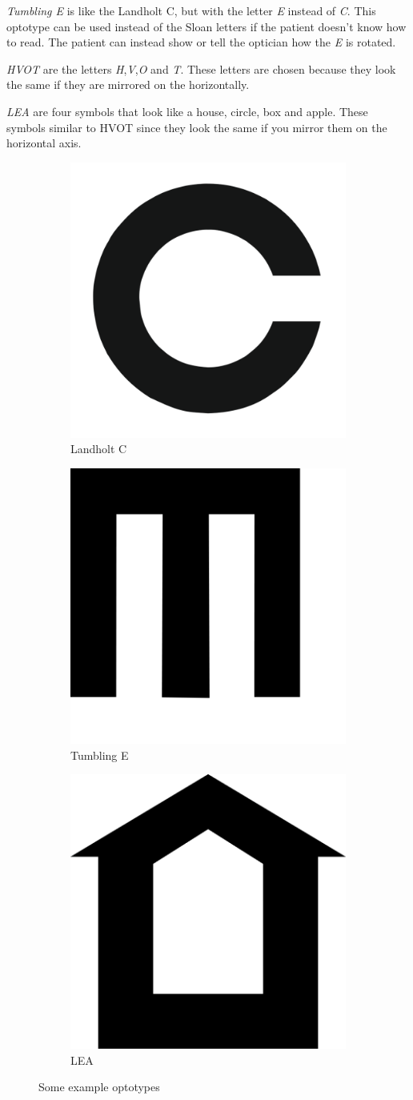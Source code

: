 \documentclass[12pt,a4paper,notitlepage]{report}
\begin{document}
\textit{Tumbling E} is like the Landholt C, but with the letter \textit{E} instead of \textit{C}. This optotype can be used instead of the Sloan letters if the patient doesn't know how to read. The patient can instead show or tell the optician how the \textit{E} is rotated\cite{Colenbrander}.

\textit{HVOT} are the letters \textit{H},\textit{V},\textit{O} and \textit{T}. These letters are chosen because they look the same if they are mirrored on the horizontally.

\textit{LEA} are four symbols that look like a house, circle, box and apple. These symbols similar to HVOT since they look the same if you mirror them on the horizontal axis.

\begin{figure}
\centering
\begin{subfigure}{.3\textwidth}
  \centering
  \includegraphics[width=.4\linewidth]{images/landholt_c_optotype.png}
  \caption{Landholt C}
  \label{fig:landholt_c}
\end{subfigure}%
\begin{subfigure}{.3\textwidth}
  \centering
  \includegraphics[width=.4\linewidth]{images/tumbling_e_optotype.png}
  \caption{Tumbling E}
  \label{fig:tumbling_e}
\end{subfigure}
\begin{subfigure}{.3\textwidth}
  \centering
  \includegraphics[width=.4\linewidth]{images/lea_optotype.png}
  \caption{LEA}
  \label{fig:lea}
\end{subfigure}
\caption{Some example optotypes}
\label{fig:optotypes_example}
\end{figure}
\end{document}

